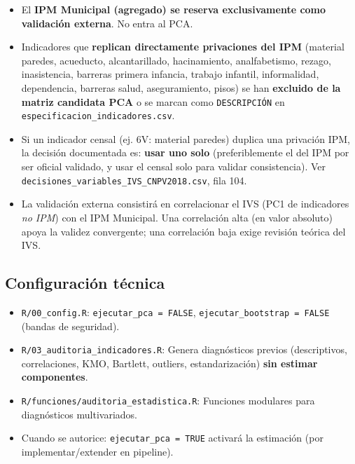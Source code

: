 \begin{itemize}
    \item El \textbf{IPM Municipal (agregado) se reserva exclusivamente como validación externa}. No entra al PCA.
    \item Indicadores que \textbf{replican directamente privaciones del IPM} (material paredes, acueducto, alcantarillado, hacinamiento, analfabetismo, rezago, inasistencia, barreras primera infancia, trabajo infantil, informalidad, dependencia, barreras salud, aseguramiento, pisos) se han \textbf{excluido de la matriz candidata PCA} o se marcan como \texttt{DESCRIPCIÓN} en \texttt{especificacion\_indicadores.csv}.
    \item Si un indicador censal (ej. 6V: material paredes) duplica una privación IPM, la decisión documentada es: \textbf{usar uno solo} (preferiblemente el del IPM por ser oficial validado, y usar el censal solo para validar consistencia). Ver \texttt{decisiones\_variables\_IVS\_CNPV2018.csv}, fila 104.
    \item La validación externa consistirá en correlacionar el IVS (PC1 de indicadores \textit{no IPM}) con el IPM Municipal. Una correlación alta (en valor absoluto) apoya la validez convergente; una correlación baja exige revisión teórica del IVS.
\end{itemize}

\subsection{Configuración técnica}
\label{sec:config_tecnica_pca}

\begin{itemize}
    \item \texttt{R/00\_config.R}: \texttt{ejecutar\_pca = FALSE}, \texttt{ejecutar\_bootstrap = FALSE} (bandas de seguridad).
    \item \texttt{R/03\_auditoria\_indicadores.R}: Genera diagnósticos previos (descriptivos, correlaciones, KMO, Bartlett, outliers, estandarización) \textbf{sin estimar componentes}.
    \item \texttt{R/funciones/auditoria\_estadistica.R}: Funciones modulares para diagnósticos multivariados.
    \item Cuando se autorice: \texttt{ejecutar\_pca = TRUE} activará la estimación (por implementar/extender en pipeline).
\end{itemize}


